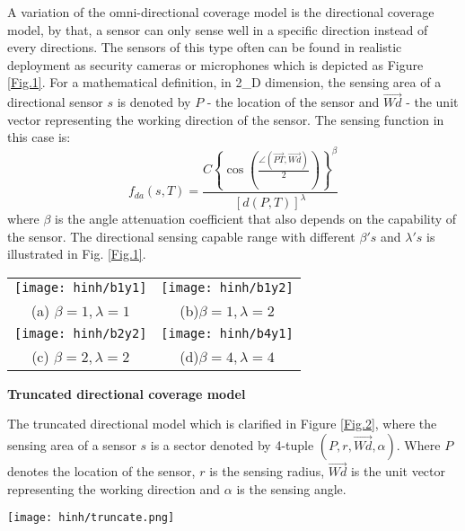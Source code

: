 \documentclass[final]{elsarticle}
\begin{document}
A variation of the omni-directional coverage model is the directional coverage model, by that, a sensor can only sense well in a specific direction instead of every directions. The sensors of this type often can be found in realistic deployment as security cameras or microphones which is depicted as Figure \ref{Fig.1}. For a mathematical definition, in 2\_D dimension, the sensing area of a directional sensor $ s $ is denoted by $ P $ - the location of the sensor and $ \overrightarrow{Wd}$ - the unit vector representing the working direction of the sensor. The sensing function in this case is:
\begin{equation}
\label{eq2}
f_{da}({s},T) = \frac{{C{{\left\{ {\cos \left( {\frac{{\angle (\overrightarrow {PT} ,\overrightarrow {Wd}) }}{2}} \right)} \right\}}^\beta }}}{{{{\left[ {d(P,T)} \right]}^\lambda }}}
\end{equation}
where $\beta$ is the angle attenuation coefficient that also depends on the capability of the sensor. The directional sensing capable range with different $ \beta's $ and $ \lambda's $ is illustrated in Fig. \ref{Fig.1}. \\
\begin{figure*}[h]
	\begin{tabular}{cc}
		\texttt{[image: hinh/b1y1]}&\texttt{[image: hinh/b1y2]}\\
		(a) $\beta =1, \lambda=1 $ &(b)$ \beta=1, \lambda=2 $\\
		\texttt{[image: hinh/b2y2]}&\texttt{[image: hinh/b4y1]}\\
		(c) $ \beta=2, \lambda=2 $& (d)$ \beta=4, \lambda=4 $\\
	\end{tabular}
	\centering
	\caption{Illustration attenuated directional sensing model with different $ \beta's $ and $ \lambda's $
	}
	\label{Fig.1}       %
\end{figure*}

\noindent\textbf{Truncated directional coverage model} 

The truncated directional model which is clarified in Figure \ref{Fig.2}, where the sensing area of a sensor $ s $ is a sector denoted by 4-tuple $( P, r, \overrightarrow{Wd}, \alpha )$. Where $ P $ denotes the location of the sensor, $ r $ is the sensing radius, $ \overrightarrow{Wd}$ is the unit vector representing the working direction and $ \alpha $ is the sensing angle. 
\begin{figure*}[h]
	\centering
	\texttt{[image: hinh/truncate.png]}
	\caption{Sensing capability of truncated directional sensor}
	\label{Fig.2}       %
\end{figure*}
\end{document}
